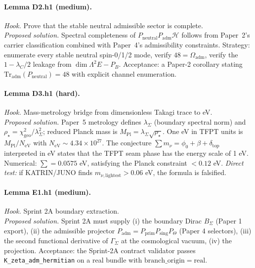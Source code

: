 \paragraph{Lemma D2.h1 (medium).}
\emph{Hook.}  Prove that the stable neutral admissible sector is
complete.\\
\emph{Proposed solution.}  Spectral completeness of \(P_{\mathrm{neutral}}P_{\mathrm{adm}}\mathcal H\) follows from Paper~2's carrier
classification combined with Paper~4's admissibility constraints.
Strategy: enumerate every stable neutral spin-0/1/2 mode, verify
\(48=\Omega_{\mathrm{adm}}\), verify the
\(1-\lambda_C/2\) leakage from \(\dim\Lambda^2 E - P_B\).
Acceptance: a Paper-2 corollary stating
\(\mathrm{Tr}_{\mathrm{adm}}(P_{\mathrm{neutral}})=48\) with explicit
channel enumeration.

\paragraph{Lemma D3.h1 (hard).}
\emph{Hook.}  Mass-metrology bridge from dimensionless Takagi trace
to eV.\\
\emph{Proposed solution.}  Paper~5 metrology defines
\(\lambda_\Sigma\) (boundary spectral norm) and
\(\rho_\star=\chi_{\mathrm{geo}}^2/\lambda_\Sigma^2\); reduced Planck
mass is \(M_{\mathrm{Pl}}=\lambda_\Sigma\sqrt{\rho_\star}\).  One eV
in TFPT units is \(M_{\mathrm{Pl}}/N_{\mathrm{eV}}\) with
\(N_{\mathrm{eV}}\sim 4.34\times 10^{27}\).  The conjecture
\(\sum m_\nu=\phi_0+\beta+\delta_{\mathrm{top}}\) interpreted in eV
states that the TFPT seam phase has the energy scale of 1 eV.
Numerical: \(\sum=0.0575\) eV, satisfying the Planck constraint
\(<0.12\) eV.  \emph{Direct test:} if KATRIN/JUNO finds
\(m_{\nu,\mathrm{lightest}}>0.06\) eV, the formula is falsified.

\paragraph{Lemma E1.h1 (medium).}
\emph{Hook.}  Sprint 2A boundary extraction.\\
\emph{Proposed solution.}  Sprint 2A must supply (i) the boundary
Dirac \(B_\Sigma\) (Paper 1 export), (ii) the admissible projector
\(P_{\mathrm{adm}}=P_{\mathrm{prim}}P_{\mathrm{sing}}P_\Theta\)
(Paper 4 selectors), (iii) the second functional derivative of
\(\Gamma_\Sigma\) at the cosmological vacuum, (iv) the projection.
Acceptance: the Sprint-2A contract validator passes
\texttt{K\_zeta\_adm\_hermitian} on a real bundle with
\(\mathrm{branch\_origin}=\mathrm{real}\).

